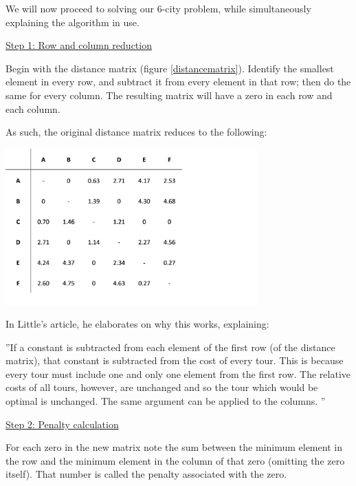 \vspace{5mm}

We will now proceed to solving our 6-city problem, while simultaneously explaining the algorithm in use.

\vspace{5mm}

\noindent
\underline{Step 1: Row and column reduction}
\vspace{1mm}

\noindent
Begin with the distance matrix (figure \ref{distancematrix}). Identify the smallest element in every row, and subtract it from every element in that row; then do the same for every column. The resulting matrix will have a zero in each row and each column.

\vspace{5mm}
\noindent
As such, the original distance matrix reduces to the following:
\vspace{3mm}

\includegraphics[height=6cm]{dmreduced}
	
\noindent	
In Little’s article, he elaborates on why this works, explaining:
\vspace{-1mm}

\begin{displayquote} 
''If a constant is subtracted from each element of the first row (of the distance matrix), that constant is subtracted from the cost of every tour. This is because every tour must include one and only one element from the first row. The relative costs of all tours, however, are unchanged and so the tour which would be optimal is unchanged. The same argument can be applied to the columns.	''
\end{displayquote}
	
\noindent	
\underline{Step 2: Penalty calculation}	
\vspace{1mm}

\noindent	
For each zero in the new matrix note the sum between the minimum element in the row and the minimum element in the column of that zero (omitting the zero itself). That number is called the penalty associated with the zero.

